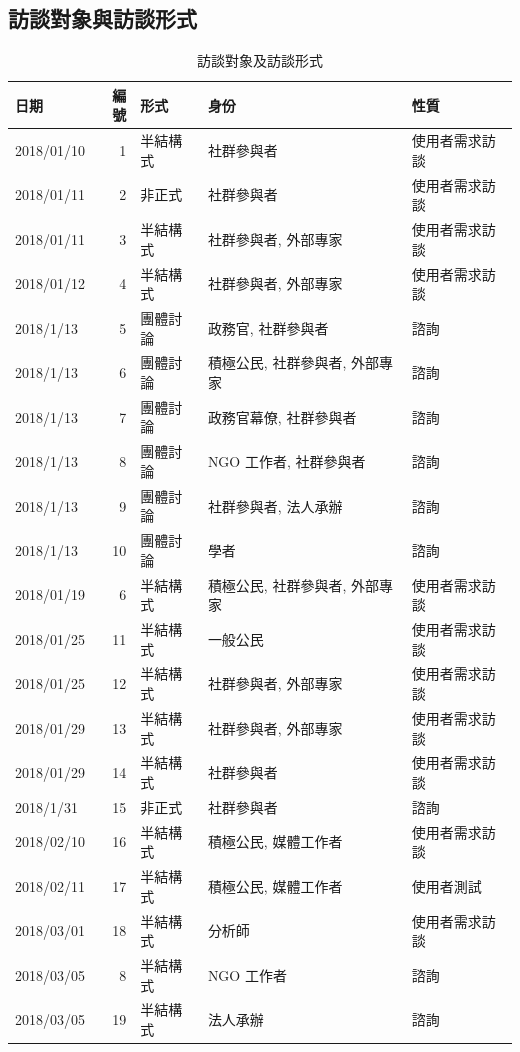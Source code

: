 \documentclass[12pt,a4paper]{article}
\begin{document}
\subsection{訪談對象與訪談形式}
\label{sec:org4a11a77}
\begin{table}[htbp]
\caption{\label{tab:orgc8bb058}
訪談對象及訪談形式}
\centering
{}
\begin{tabular}{lrlll}
\toprule
日期 & 編號 & 形式 & 身份 & 性質\\
\midrule
2018/01/10 & 1 & 半結構式 & 社群參與者 & 使用者需求訪談\\
2018/01/11 & 2 & 非正式 & 社群參與者 & 使用者需求訪談\\
2018/01/11 & 3 & 半結構式 & 社群參與者, 外部專家 & 使用者需求訪談\\
2018/01/12 & 4 & 半結構式 & 社群參與者, 外部專家 & 使用者需求訪談\\
2018/1/13 & 5 & 團體討論 & 政務官, 社群參與者 & 諮詢\\
2018/1/13 & 6 & 團體討論 & 積極公民, 社群參與者, 外部專家 & 諮詢\\
2018/1/13 & 7 & 團體討論 & 政務官幕僚, 社群參與者 & 諮詢\\
2018/1/13 & 8 & 團體討論 & NGO 工作者, 社群參與者 & 諮詢\\
2018/1/13 & 9 & 團體討論 & 社群參與者, 法人承辦 & 諮詢\\
2018/1/13 & 10 & 團體討論 & 學者 & 諮詢\\
2018/01/19 & 6 & 半結構式 & 積極公民, 社群參與者, 外部專家 & 使用者需求訪談\\
2018/01/25 & 11 & 半結構式 & 一般公民 & 使用者需求訪談\\
2018/01/25 & 12 & 半結構式 & 社群參與者, 外部專家 & 使用者需求訪談\\
2018/01/29 & 13 & 半結構式 & 社群參與者, 外部專家 & 使用者需求訪談\\
2018/01/29 & 14 & 半結構式 & 社群參與者 & 使用者需求訪談\\
2018/1/31 & 15 & 非正式 & 社群參與者 & 諮詢\\
2018/02/10 & 16 & 半結構式 & 積極公民, 媒體工作者 & 使用者需求訪談\\
2018/02/11 & 17 & 半結構式 & 積極公民, 媒體工作者 & 使用者測試\\
2018/03/01 & 18 & 半結構式 & 分析師 & 使用者需求訪談\\
2018/03/05 & 8 & 半結構式 & NGO 工作者 & 諮詢\\
2018/03/05 & 19 & 半結構式 & 法人承辦 & 諮詢\\

\end{tabular}
\end{table}
\end{document}
